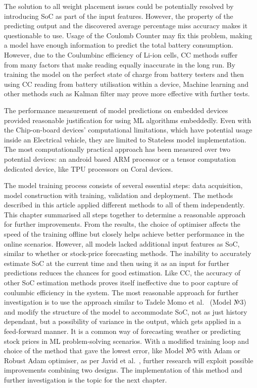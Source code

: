 %
%
The solution to all weight placement issues could be potentially resolved by introducing SoC as part of the input features.
However, the property of the predicting output and the discovered average percentage miss accuracy makes it questionable to use.
Usage of the Coulomb Counter may fix this problem, making a model have enough information to predict the total battery consumption.
However, due to the Coulumbinc efficiency of Li-ion cells, CC methods suffer from many factors that make reading equally inaccurate in the long run.
By training the model on the perfect state of charge from battery testers and then using CC reading from battery utilisation within a device, Machine learning and other methods such as Kalman filter may prove more effective with further tests.

%
%
The performance measurement of model predictions on embedded devices provided reasonable justification for using ML algorithms embeddedly.
Even with the Chip-on-board devices' computational limitations, which have potential usage inside an Electrical vehicle, they are limited to Stateless model implementation.
The most computationally practical approach has been measured over two potential devices: an android based ARM processor or a tensor computation dedicated device, like TPU processors on Coral devices.

%
%
The model training process consists of several essential steps: data acquisition, model construction with training, validation and deployment.
The methods described in this article applied different methods to all of them independently.
This chapter summarised all steps together to determine a reasonable approach for further improvements.
From the results, the choice of optimiser affects the speed of the training offline but closely helps achieve better performance in the online scenarios.
However, all models lacked additional input features as SoC, similar to whether or stock-price forecasting methods.
The inability to accurately estimate SoC at the current time and then using it as an input for further predictions reduces the chances for good estimation.
Like CC, the accuracy of other SoC estimation methods proves itself ineffective due to poor capture of coulumbic efficiency in the system.
The most reasonable approach for further investigation is to use the approach similar to Tadele Momo et al.~\cite{mamo_long_2020} (Model №3) and modify the structure of the model to accommodate SoC, not as just history dependant, but a possibility of variance in the output, which gets applied in a feed-forward manner. 
It is a common way of forecasting weather or predicting stock prices in ML problem-solving scenarios.
With a modified training loop and choice of the method that gave the lowest error, like Model №5 with Adam or Robust Adam optimiser, as per Javid et al.~\cite{javid_adaptive_2020}, further research will exploit possible improvements combining two designs.
The implementation of this method and further investigation is the topic for the next chapter.